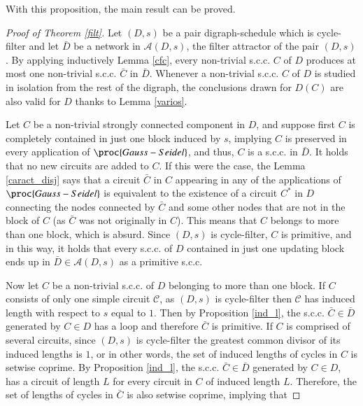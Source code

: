 \documentclass[preprint,12pt]{elsarticle}
\begin{document}
With this proposition, the main result can be proved.

\begin{proof}[Proof of Theorem \ref{filt}]
Let $(D,s)$ be a pair digraph-schedule which is cycle-filter and let $\bar{D}$ be a network in $\mathcal{A}(D,s)$, the filter attractor of the pair $(D,s)$. By applying inductively Lemma \ref{cfc}, every non-trivial s.c.c. $C$ of $D$ produces at most one non-trivial s.c.c. $\bar{C}$ in $\bar{D}$. Whenever a non-trivial s.c.c. $C$ of $D$ is studied in isolation from the rest of the digraph, %
the conclusions drawn for $D(C)$ are also valid for $D$ thanks to Lemma \ref{varios}.\par
Let $C$ be a non-trivial strongly connected component in $D$, and suppose first $C$ is completely contained in just one block induced by $s$, implying $C$ is preserved in every application of $\proc{Gauss-Seidel}$, and thus, $C$ is a s.c.c. in $\bar{D}$. It holds that %
no new circuits are added to $C$. %
If this were the case, the Lemma \ref{caract_disj} says that a circuit $\bar{C}$ in $C$ appearing in any of the applications of $\proc{Gauss-Seidel}$ is equivalent to the existence of a circuit $C^*$ in $D$ connecting the nodes connected by $\bar{C}$ and some other nodes that are not in the block of $C$ (as $\bar{C}$ was not originally in $C$). This means that $C$ belongs to more than one block, which is absurd. Since $(D,s)$ is cycle-filter, $C$ is primitive, and in this way, it holds that every s.c.c. of $D$ contained in just one updating block ends up in $\bar{D} \in \mathcal{A}(D,s)$ as a primitive s.c.c.\par
Now let $C$ be a non-trivial s.c.c. of $D$ belonging to more than one block. If $C$ consists of only one simple circuit $\mathcal{C}$, as $(D,s)$ is cycle-filter then $\mathcal{C}$ has induced length with respect to $s$ equal to $1$. Then by Proposition \ref{ind_l}, the s.c.c. $\bar{C} \in \bar{D}$ generated by $C \in D$ has a loop and therefore $\bar{C}$ is primitive. If $C$ is comprised of several circuits, since $(D,s)$ is cycle-filter the greatest common divisor of its induced lengths is $1$, or in other words, the set of induced lengths of cycles in $C$ is setwise coprime. By Proposition \ref{ind_l}, the s.c.c. $\bar{C} \in \bar{D}$ generated by $C \in D$, has a circuit of length $L$ for every circuit in $C$ of induced length $L$. Therefore, the set of lengths of cycles in $\bar{C}$ is also setwise coprime, implying that %

\end{proof}
\end{document}
